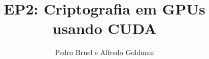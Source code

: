\documentclass[final,12pt,a4paper]{elsarticle}
\begin{document}
\begin{frontmatter}


\title{EP2: Criptografia em GPUs usando CUDA}




\author{Pedro Bruel e Alfredo Goldman}

\address{MAC 5742-0219 Introdução à Programação Concorrente, Paralela e Distribuída}




\end{frontmatter}
\end{document}
